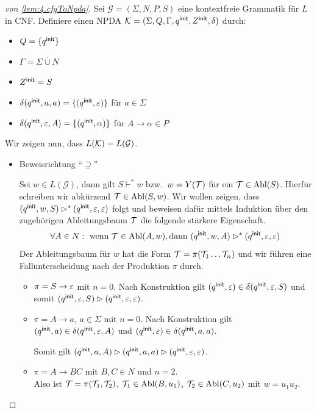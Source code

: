   
\begin{proof}[von \autoref{lem:4.cfgToNpda}]
Sei $\mathcal{G} = (\Sigma,N,P,S)$ eine kontextfreie Grammatik für $L$ in \ac{CNF}.
                Definiere einen \ac{NPDA} $\mathcal{K} = (\Sigma,Q,\Gamma,q^\mathsf{init},Z^\mathsf{init},\delta)$ durch:
                \begin{itemize}
                        \item $Q = \{q^\mathsf{init}\}$ 
                        \item $\Gamma = \Sigma\overset.\cup N$
                        \item $Z^\mathsf{init} = S$
                        \item $\delta(q^\mathsf{init},a,a) = \{(q^\mathsf{init},\varepsilon)\} $ für $ a\in\Sigma$
                        \item $\delta(q^\mathsf{init},\varepsilon,A) = \{(q^\mathsf{init},\alpha)\}$ für $A\to\alpha\in P$
                \end{itemize}
Wir zeigen nun, dass $L(\mathcal{K}) = L(\mathcal{G})$.
\begin{itemize}
\item Beweisrichtung "`$\supseteq$"'
  
  Sei $w\in L(\mathcal{G})$, dann gilt $S\vdash^* w$ bzw.\ $w=Y(\mathcal{T})$
  für ein $\mathcal{T} \in \operatorname{Abl}(S)$. Hierfür schreiben wir
  abkürzend $\mathcal{T} \in \operatorname{Abl}(S, w)$.
  Wir wollen zeigen, dass $(q^\mathsf{init}, w, S) \rhd^* (q^\mathsf{init}, \varepsilon,
  \varepsilon)$ folgt und beweisen dafür mittels Induktion über den
  zugehörigen Ableitungsbaum $\mathcal{T}$ die folgende
  stärkere Eigenschaft. 
  \begin{displaymath}
    \forall A \in N: \text{ wenn } \mathcal{T} \in \operatorname{Abl}(A, w),
    \text{dann }
    (q^\mathsf{init}, w, A) \rhd^* (q^\mathsf{init}, \varepsilon, \varepsilon) 
  \end{displaymath}
  Der Ableitungsbaum für $w$ hat die Form $\mathcal{T} = \pi (\mathcal{T}_1\dots\mathcal{T}_n)$ und wir
  führen eine Fallunterscheidung nach der Produktion $\pi$
  durch.
  \begin{itemize}
  \item $\pi = S \to \varepsilon$ mit $n=0$. 
    Nach Konstruktion gilt $(q^\mathsf{init}, \varepsilon) \in \delta(q^\mathsf{init}, \varepsilon,
    S)$ und somit $(q^\mathsf{init}, \varepsilon, S) \rhd (q^\mathsf{init}, \varepsilon, \varepsilon)$. 
  \item $\pi = A \to a$, $a \in \Sigma$ mit $n=0$.
    Nach Konstruktion gilt $(q^\mathsf{init}, a) \in \delta(q^\mathsf{init}, \varepsilon, A)$
    und $(q^\mathsf{init}, \varepsilon) \in \delta(q^\mathsf{init}, a, a)$. 

    Somit gilt $(q^\mathsf{init}, a, A) \rhd (q^\mathsf{init}, a, a) \rhd
    (q^\mathsf{init}, \varepsilon, \varepsilon)$.
  \item $\pi = A \to BC$ mit $B,C \in N$ und $n=2$.\\
   Also ist $\mathcal{T} = \pi(\mathcal{T}_1, \mathcal{T}_2)$,
   $\mathcal{T}_1 \in \operatorname{Abl}(B, u_1)$, $\mathcal{T}_2 \in
   \operatorname{Abl}(C, u_2)$ mit $w = u_1u_2$. 


\end{itemize}
\end{itemize}
\end{proof}
